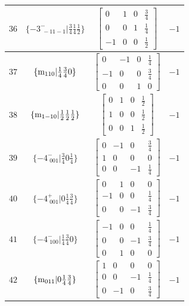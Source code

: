 \documentclass[fleqn,8pt]{jsarticle}
\begin{document}
\begin{longtable}{cccc}
$ 36 $ & $ \{-3^{-}_{\,\,-11-1}|\frac{3}{4} \frac{1}{4} \frac{1}{2}\} $ & $ \begin{bmatrix} 0 & 1 & 0 & \frac{3}{4} \\ 0 & 0 & 1 & \frac{1}{4} \\ -1 & 0 & 0 & \frac{1}{2} \end{bmatrix} $ & $ -1 $ \\ \hline
$ 37 $ & $ \{{\rm m}_{110}|\frac{1}{4} \frac{3}{4} 0\} $ & $ \begin{bmatrix} 0 & -1 & 0 & \frac{1}{4} \\ -1 & 0 & 0 & \frac{3}{4} \\ 0 & 0 & 1 & 0 \end{bmatrix} $ & $ -1 $ \\ \hline
$ 38 $ & $ \{{\rm m}_{1-10}|\frac{1}{2} \frac{1}{2} \frac{1}{2}\} $ & $ \begin{bmatrix} 0 & 1 & 0 & \frac{1}{2} \\ 1 & 0 & 0 & \frac{1}{2} \\ 0 & 0 & 1 & \frac{1}{2} \end{bmatrix} $ & $ -1 $ \\ \hline
$ 39 $ & $ \{-4^{-}_{\,\,001}|\frac{3}{4} 0 \frac{1}{4}\} $ & $ \begin{bmatrix} 0 & -1 & 0 & \frac{3}{4} \\ 1 & 0 & 0 & 0 \\ 0 & 0 & -1 & \frac{1}{4} \end{bmatrix} $ & $ -1 $ \\ \hline
$ 40 $ & $ \{-4^{+}_{\,\,001}|0 \frac{1}{4} \frac{3}{4}\} $ & $ \begin{bmatrix} 0 & 1 & 0 & 0 \\ -1 & 0 & 0 & \frac{1}{4} \\ 0 & 0 & -1 & \frac{3}{4} \end{bmatrix} $ & $ -1 $ \\ \hline
$ 41 $ & $ \{-4^{-}_{\,\,100}|\frac{1}{4} \frac{3}{4} 0\} $ & $ \begin{bmatrix} -1 & 0 & 0 & \frac{1}{4} \\ 0 & 0 & -1 & \frac{3}{4} \\ 0 & 1 & 0 & 0 \end{bmatrix} $ & $ -1 $ \\ \hline
$ 42 $ & $ \{{\rm m}_{011}|0 \frac{1}{4} \frac{3}{4}\} $ & $ \begin{bmatrix} 1 & 0 & 0 & 0 \\ 0 & 0 & -1 & \frac{1}{4} \\ 0 & -1 & 0 & \frac{3}{4} \end{bmatrix} $ & $ -1 $ \\ \hline

\end{longtable}
\end{document}
